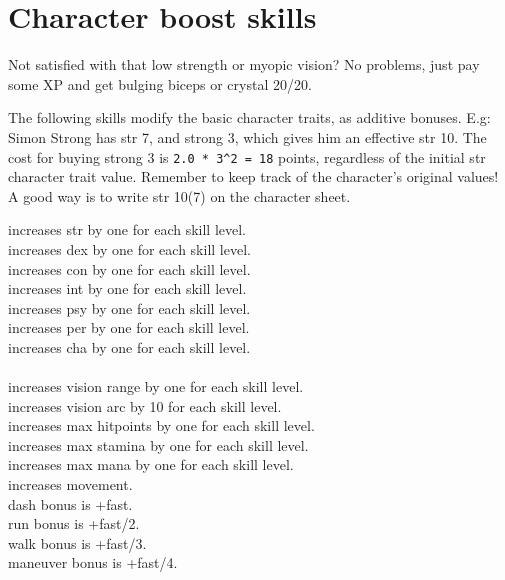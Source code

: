 \section*{Character boost skills}

Not satisfied with that low strength or myopic vision? No problems, just pay some XP and get bulging biceps or crystal 20/20.

The following skills modify the basic character traits, as additive bonuses.
E.g: Simon Strong has str 7, and strong 3, which gives him an effective str 10.
The cost for buying strong 3 is \verb|2.0 * 3^2 = 18| points, regardless of the initial str character trait value. Remember to keep track of the character's original values! A good way is to write str 10(7) on the character sheet.


\openskillslist

 increases str by one for each skill level. \\
 increases dex by one for each skill level. \\
 increases con by one for each skill level. \\
 increases int by one for each skill level. \\
 increases psy by one for each skill level. \\
 increases per by one for each skill level. \\
 increases cha by one for each skill level. \\
 \\
 increases vision range by one for each skill level. \\
 increases vision arc by 10 for each skill level. \\
 increases max hitpoints by one for each skill level. \\
 increases max stamina by one for each skill level. \\
 increases max mana by one for each skill level. \\
 increases movement. \\
dash bonus is +fast. \\
run bonus is +fast/2. \\
walk bonus is +fast/3. \\
maneuver bonus is +fast/4.

